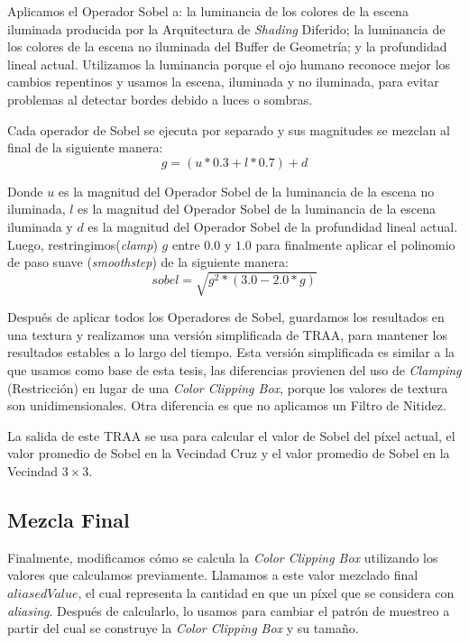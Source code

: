 \documentclass[pregrado]{tesis-usb} %
\begin{document}
Aplicamos el Operador Sobel a: la luminancia de los colores de la escena iluminada producida por la Arquitectura de \textit{Shading} Diferido; la luminancia de los colores de la escena no iluminada del Buffer de Geometría; y la profundidad lineal actual. Utilizamos la luminancia porque el ojo humano reconoce mejor los cambios repentinos y usamos la escena, iluminada y no iluminada, para evitar problemas al detectar bordes debido a luces o sombras.

Cada operador de Sobel se ejecuta por separado y sus magnitudes se mezclan al final de la siguiente manera:
\begin{equation} \label{eq:sobel_g}
	g=(u*0.3 +l*0.7)+d 
\end{equation}

Donde $u$ es la magnitud del Operador Sobel de la luminancia de la escena no iluminada, $l$ es la magnitud del Operador Sobel de la luminancia de la escena iluminada y $d$ es la magnitud del Operador Sobel de la profundidad lineal actual. \\

Luego, restringimos(\textit{clamp}) $g$ entre $0.0$ y $1.0$ para finalmente aplicar el polinomio de paso suave (\textit{smoothstep}) de la siguiente manera:
\begin{equation} \label{eq:sobel_sqrt}
sobel=\sqrt{g^2*(3.0-2.0*g)} 
\end{equation}

Después de aplicar todos los Operadores de Sobel, guardamos los resultados en una textura y realizamos una versión simplificada de TRAA, para mantener los resultados estables a lo largo del tiempo. Esta versión simplificada es similar a la que usamos como base de esta tesis, las diferencias provienen del uso de \textit{Clamping} (Restricción) en lugar de una \textit{Color Clipping Box}, porque los valores de textura son unidimensionales. Otra diferencia es que no aplicamos un Filtro de Nitidez.

La salida de este TRAA se usa para calcular el valor de Sobel del píxel actual, el valor promedio de Sobel en la Vecindad Cruz y el valor promedio de Sobel en la Vecindad $3\times 3$.

\subsection{Mezcla Final}
Finalmente, modificamos cómo se calcula la \textit{Color Clipping Box} utilizando los valores que calculamos previamente. Llamamos a este valor mezclado final $aliasedValue$, el cual representa la cantidad en que un píxel que se considera con \textit{aliasing}. Después de calcularlo, lo usamos para cambiar el patrón de muestreo a partir del cual se construye la \textit{Color Clipping Box} y su tamaño.
\end{document}
